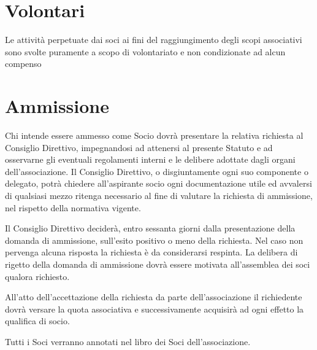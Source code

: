 \documentclass[legalpaper, 11pt]{exam}
\let\tempone\enumerate
\let\temptwo\endenumerate
\renewenvironment{enumerate}{\tempone\addtolength{\itemsep}{-0.45\baselineskip}}{\temptwo}
\begin{document}
{\section{Volontari}
\begin{enumerate}
    \item Le attività perpetuate dai soci ai fini del raggiungimento degli scopi associativi sono svolte puramente a scopo di volontariato e non condizionate ad alcun compenso
\end{enumerate}

\section{Ammissione}
\begin{enumerate}
 \item Chi intende essere ammesso come Socio dovrà presentare la relativa richiesta al Consiglio Direttivo, impegnandosi ad attenersi al presente Statuto e ad osservarne gli eventuali regolamenti interni e le delibere adottate dagli organi dell’associazione. Il Consiglio Direttivo, o disgiuntamente ogni suo componente o delegato, potrà chiedere all’aspirante socio ogni documentazione utile ed avvalersi di qualsiasi mezzo ritenga necessario al fine di valutare la richiesta di ammissione, nel rispetto della normativa vigente.
 \item Il Consiglio Direttivo deciderà, entro sessanta giorni dalla presentazione della domanda di ammissione, sull’esito positivo o meno della richiesta. Nel caso non pervenga alcuna risposta la richiesta è da considerarsi respinta. La delibera di rigetto della domanda di ammissione dovrà essere motivata all’assemblea dei soci qualora richiesto.
 \item All’atto dell’accettazione della richiesta da parte dell’associazione il richiedente dovrà versare la quota associativa e successivamente acquisirà ad ogni effetto la qualifica di socio.
 \item Tutti i Soci verranno annotati nel libro dei Soci dell’associazione.
\end{enumerate}

}
\end{document}
